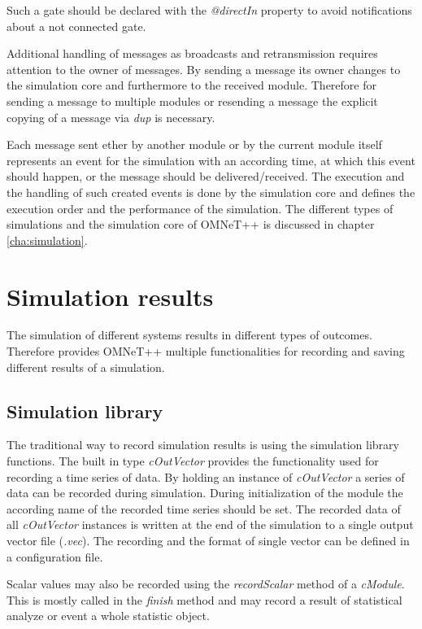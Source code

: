 Such a gate should be declared with the \emph{@directIn} property to avoid notifications about a not connected gate. \cite[section 4.7.5]{omnet_manual}

Additional handling of messages as broadcasts and retransmission requires attention to the owner of messages.
By sending a message its owner changes to the simulation core and furthermore to the received module.
Therefore for sending a message to multiple modules or resending a message the explicit copying of a message via \emph{dup} is necessary. \cite[section 4.7.3]{omnet_manual}

Each message sent ether by another module or by the current module itself represents an event for the simulation with an according time, at which this event should happen, or the message should be delivered/received.
The execution and the handling of such created events is done by the simulation core and defines the execution order and the performance of the simulation.
The different types of simulations and the simulation core of OMNeT++ is discussed in chapter \ref{cha:simulation}.


\section{Simulation results}
\label{sec:omnet_results}
The simulation of different systems results in different types of outcomes.
Therefore provides OMNeT++ multiple functionalities for recording and saving different results of a simulation.


\subsection{Simulation library}
\label{sec:omnet_results_sim_lib}
The traditional way to record simulation results is using the simulation library functions.
The built in type \emph{cOutVector} provides the functionality used for recording a time series of data.
By holding an instance of \emph{cOutVector} a series of data can be recorded during simulation.
During initialization of the module the according name of the recorded time series should be set.
The recorded data of all \emph{cOutVector} instances is written at the end of the simulation to a single output vector file (\emph{.vec}).
The recording and the format of single vector can be defined in a configuration file. \cite[section 7.9.1]{omnet_manual}

Scalar values may also be recorded using the \emph{recordScalar} method of a \emph{cModule}.
This is mostly called in the \emph{finish} method and may record a result of statistical analyze or event a whole statistic object.\cite[section 7.9.2]{omnet_manual}


